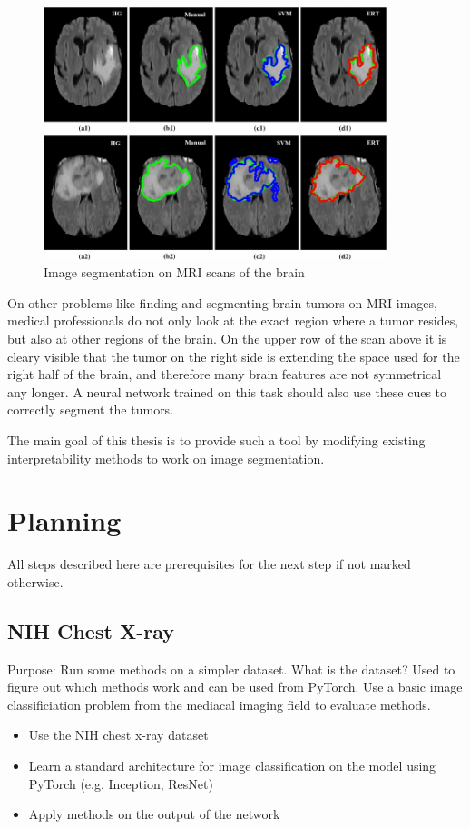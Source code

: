 \begin{figure}[H]
\centering
\caption{Image segmentation on MRI scans of the brain\cite{soltaninejad2017automated}}
\includegraphics[width=10cm]{images/brain_segmentation.jpg}
\end{figure}

On other problems like finding and segmenting brain tumors on MRI images, medical professionals do not only look at the exact region where a tumor resides, but also at other regions of the brain. On the upper row of the scan above it is cleary visible that the tumor on the right side is extending the space used for the right half of the brain, and therefore many brain features are not symmetrical any longer. A neural network trained on this task should also use these cues to correctly segment the tumors. 

The main goal of this thesis is to provide such a tool by modifying existing interpretability methods to work on image segmentation.

\section{Planning}
All steps described here are prerequisites for the next step if not marked otherwise.

\subsection{NIH Chest X-ray}
Purpose: Run some methods on a simpler dataset.
What is the dataset?
Used to figure out which methods work and can be used from PyTorch.
Use a basic image classificiation problem from the mediacal imaging field to evaluate methods.
\begin{itemize}
    \item Use the NIH chest x-ray dataset
    \item Learn a standard architecture for image classification on the model using PyTorch (e.g. Inception, ResNet)
    \item Apply methods on the output of the network
\end{itemize}


